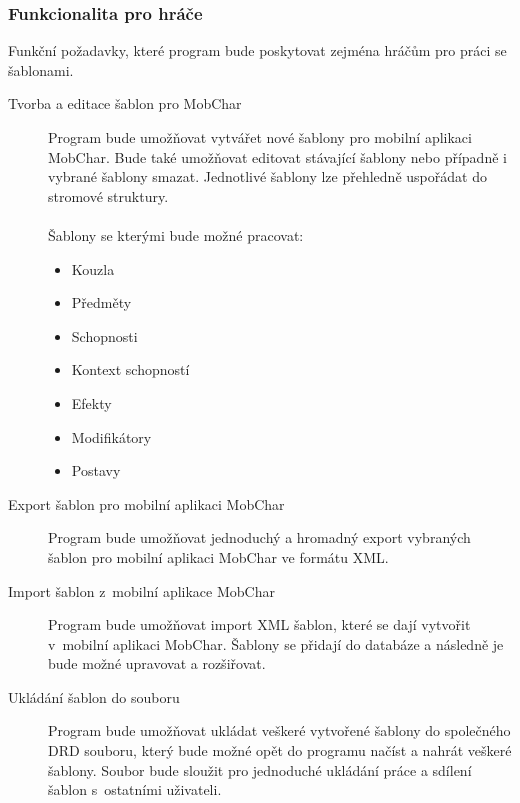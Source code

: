 \documentclass[thesis=B,czech]{resources/FITthesis}[2012/06/26]
\begin{document}
\subsubsection{Funkcionalita pro hráče}
Funkční požadavky, které program bude poskytovat zejména hráčům pro práci se šablonami.
\begin{description}

\item[Tvorba a editace šablon pro MobChar] Program bude umožňovat vytvářet nové šablony pro mobilní aplikaci MobChar. Bude také umožňovat editovat stávající šablony nebo případně i vybrané šablony smazat. Jednotlivé šablony lze přehledně uspořádat do stromové struktury.\\
\\
Šablony se kterými bude možné pracovat:
				\begin{itemize}
					\item Kouzla
					\item Předměty
					\item Schopnosti
					\item Kontext schopností
					\item Efekty
					\item Modifikátory
					\item Postavy
				\end{itemize}		
\item[Export šablon pro mobilní aplikaci MobChar] Program bude umožňovat jednoduchý a hromadný export vybraných šablon pro mobilní aplikaci MobChar ve formátu XML.

\item[Import šablon z~mobilní aplikace MobChar] Program bude umožňovat import XML šablon, které se dají vytvořit v~mobilní aplikaci MobChar. Šablony se přidají do databáze a následně je bude možné upravovat a rozšiřovat.

\item[Ukládání šablon do souboru] Program bude umožňovat ukládat veškeré vytvořené šablony do společného DRD souboru, který bude možné opět do programu načíst a nahrát veškeré šablony. Soubor bude sloužit pro jednoduché ukládání práce a sdílení šablon s~ostatními uživateli. 
\end{description}
\end{document}
